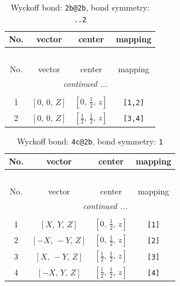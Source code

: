\documentclass[fleqn,8pt]{jsarticle}
\begin{document}
\renewcommand{\arraystretch}{1.2}
\begin{longtable}{cccc}
\caption{Wyckoff bond: {\tt 2b@2b}, bond symmetry: {\tt ..2}}
 \\
 \hline \hline
No. & vector & center & mapping \\ \hline \endfirsthead

\multicolumn{3}{l}{\tablename\ \thetable{}} \\
 \hline \hline
No. & vector & center & mapping \\ \hline \endhead

 \hline \hline
\multicolumn{3}{r}{\footnotesize\it continued ...} \\ \endfoot

 \hline \hline
\multicolumn{3}{r}{} \\ \endlastfoot

1 & $\left[ 0,\, 0,\, Z \right]$ & $\left[ 0,\, \frac{1}{2},\, z \right]$ & {\tt [1,2]} \\ \hline
2 & $\left[ 0,\, 0,\, Z \right]$ & $\left[ \frac{1}{2},\, \frac{1}{2},\, z \right]$ & {\tt [3,4]} \\
\end{longtable}
\renewcommand{\arraystretch}{1.2}
\begin{longtable}{cccc}
\caption{Wyckoff bond: {\tt 4c@2b}, bond symmetry: {\tt 1}}
 \\
 \hline \hline
No. & vector & center & mapping \\ \hline \endfirsthead

\multicolumn{3}{l}{\tablename\ \thetable{}} \\
 \hline \hline
No. & vector & center & mapping \\ \hline \endhead

 \hline \hline
\multicolumn{3}{r}{\footnotesize\it continued ...} \\ \endfoot

 \hline \hline
\multicolumn{3}{r}{} \\ \endlastfoot

1 & $\left[ X,\, Y,\, Z \right]$ & $\left[ 0,\, \frac{1}{2},\, z \right]$ & {\tt [1]} \\ \hline
2 & $\left[ - X,\, - Y,\, Z \right]$ & $\left[ 0,\, \frac{1}{2},\, z \right]$ & {\tt [2]} \\ \hline
3 & $\left[ X,\, - Y,\, Z \right]$ & $\left[ \frac{1}{2},\, \frac{1}{2},\, z \right]$ & {\tt [3]} \\ \hline
4 & $\left[ - X,\, Y,\, Z \right]$ & $\left[ \frac{1}{2},\, \frac{1}{2},\, z \right]$ & {\tt [4]} \\
\end{longtable}
\end{document}
